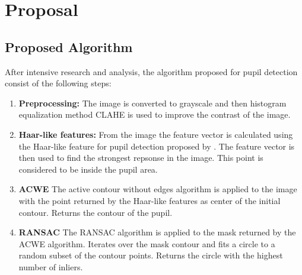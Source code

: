 \chapter{Proposal}
\label{chap:proposal}
\section{Proposed Algorithm}
After intensive research and analysis, the algorithm proposed for pupil detection consist of the following steps: 
\begin{enumerate}
    \item \textbf{Preprocessing:} The image is converted to grayscale and then histogram equalization method CLAHE is used to improve the contrast of the image.
    \item \textbf{Haar-like features:} From the image the feature vector is calculated using the Haar-like feature for pupil detection proposed by \cite{HaarLikeFeatures}. The feature vector is then used to find the strongest repsonse in the image. This point is considered to be inside the pupil area. 
    \item \textbf{ACWE} The active contour without edges algorithm is applied to the image with the point returned by the Haar-like features as center of the initial contour. Returns the contour of the pupil.
    \item \textbf{RANSAC} The RANSAC algorithm is applied to the mask returned by the ACWE algorithm. Iterates over the mask contour and fits a circle to a random subset of the contour points. Returns the circle with the highest number of inliers.
\end{enumerate}